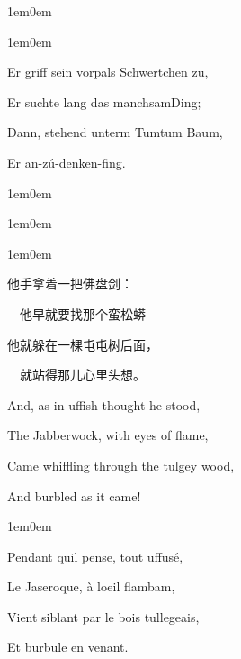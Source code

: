 \documentclass[
  12pt,
  twoside,
  openright,
  oldfontcommands,
]{memoir}
\begin{document}
\hfill\break

\begin{adjustwidth}{1em}{0em}

\begin{adjustwidth}{1em}{0em}

Er griff sein vorpals Schwertchen zu,

Er suchte lang das manchsam\textquotesingle Ding;

Dann, stehend unterm Tumtum Baum,

Er an-zú-denken-fing.

\end{adjustwidth}

\end{adjustwidth}

\hfill\break

\begin{adjustwidth}{1em}{0em}

\begin{adjustwidth}{1em}{0em}

\begin{adjustwidth}{1em}{0em}

他手拿着一把佛盘剑：

　他早就要找那个蛮松蟒------

他就躲在一棵屯屯树后面，

　就站得那儿心里头想。

\end{adjustwidth}

\end{adjustwidth}

\end{adjustwidth}

\hfill\break

And, as in uffish thought he stood,

The Jabberwock, with eyes of flame,

Came whiffling through the tulgey wood,

And burbled as it came!

\hfill\break

\begin{adjustwidth}{1em}{0em}

Pendant qu\textquotesingle il pense, tout uffusé,

Le Jaseroque, à l\textquotesingle oeil flambam,

Vient siblant par le bois tullegeais,

Et burbule en venant.

\end{adjustwidth}
\end{document}
